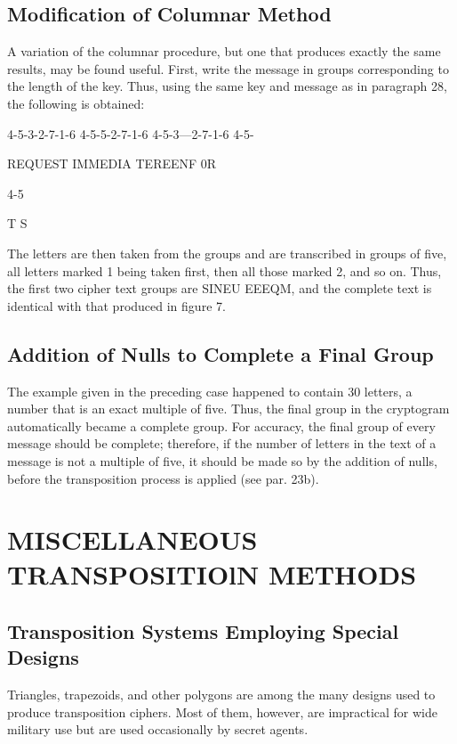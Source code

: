 \subsection{Modification of Columnar Method}

A variation of the columnar procedure, but one that produces exactly
the same results, may be found useful. First, write the message in groups
corresponding to the length of the key. Thus, using the same key and
message as in paragraph 28, the following is obtained:

4-5-3-2-7-1-6 4-5-5-2-7-1-6 4-5-3—2-7-1-6 4-5-

REQUEST IMMEDIA TEREENF 0R

4-5

T S

The letters are then taken from the groups and are transcribed in groups
of five, all letters marked 1 being taken first, then all those marked 2, and
so on. Thus, the first two cipher text groups are SINEU EEEQM,
and the complete text is identical with that produced in figure 7.

\subsection{Addition of Nulls to Complete a Final Group}

The example given in the preceding case happened to contain 30 letters,
a number that is an exact multiple of five. Thus, the final group in the
cryptogram automatically became a complete group. For accuracy, the
final group of every message should be complete; therefore, if the number of letters in the text of a message is not a multiple of five, it should
be made so by the addition of nulls, before the transposition process
is applied (see par. 23b).

\section{MISCELLANEOUS TRANSPOSITIOlN METHODS}
\subsection{Transposition Systems Employing Special Designs}

\mypara Triangles, trapezoids, and other polygons are among the many
designs used to produce transposition ciphers. Most of them, however,
are impractical for wide military use but are used occasionally by secret
agents.


